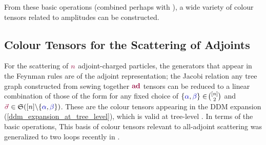 \documentclass[12pt,a4paper]{article}\let\ifpdf\relax
\begin{document}
From these basic operations (combined perhaps with ), a wide variety of colour tensors related to amplitudes can be constructed. 


\subsection{Colour Tensors for the Scattering of Adjoints}\label{subsec:tensors_for_adjoints}\vspace{-4pt}

For the scattering of $\r{n}$ adjoint-charged particles, the generators that appear in the Feynman rules are of the adjoint representation; the Jacobi relation
%
%
any tree graph constructed from sewing together $\mathbf{\r{ad}}$ tensors can be reduced to a linear combination of those of the form 
%
%
for any fixed choice of $\{\b{\alpha},\b{\beta}\}\in\!\binom{[n]}{2}$ and $\r{\vec{\sigma}}\in\mathfrak{S}([n]\backslash\{\b{\alpha},\b{\beta}\})$. These are the colour tensors appearing in the DDM expansion (\ref{ddm_expansion_at_tree_level}), which is valid at tree-level \cite{DelDuca:1999rs}. In terms of the basic operations,
%
%
This basis of colour tensors relevant to all-adjoint scattering was generalized to two loops recently in \cite{Dunbar:2026sle}.\\[-10pt]
\end{document}
